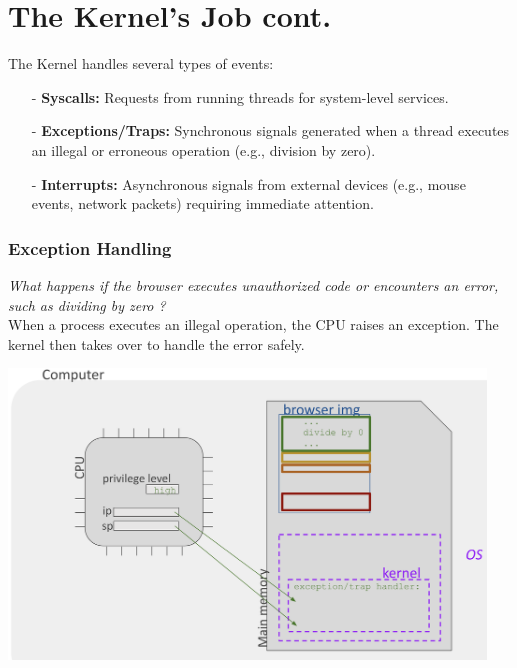 \section{The Kernel's Job cont.}
The Kernel handles several types of events:
\begin{itemize}[topsep=3px]
  \item[-] \textbf{Syscalls:} Requests from running threads for system-level services.
  \item[-] \textbf{Exceptions/Traps:} Synchronous signals generated when a thread executes an illegal or erroneous operation (e.g., division by zero).
  \item[-] \textbf{Interrupts:} Asynchronous signals from external devices (e.g., mouse events, network packets) requiring immediate attention.
\end{itemize}
\vspace{10px}
\begin{minipage}[htp]{0.45\textwidth}
\subsubsection*{Exception Handling}
\textit{What happens if the browser executes unauthorized code or encounters an error, such as dividing by zero ?}\\
When a process executes an illegal operation, the CPU raises an exception. The kernel then takes over to handle the error safely.
\vspace{8px}
\begin{center}
  \includegraphics[width=0.95\textwidth]{chapters/L3/images/exception.png}
\end{center}
\end{minipage} 
\hfill 
\vline 
\hfill 
